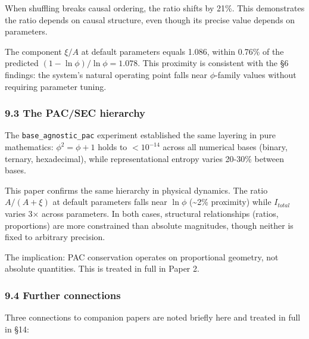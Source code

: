 \documentclass[
  11pt,
  a4paper]{article}
\begin{document}
When shuffling breaks causal ordering, the ratio shifts by 21\%. This
demonstrates the ratio depends on causal structure, even though its
precise value depends on parameters.

The component \(\xi/A\) at default parameters equals 1.086, within
0.76\% of the predicted \((1-\ln\phi)/\ln\phi = 1.078\). This proximity
is consistent with the §6 findings: the system's natural operating point
falls near \(\phi\)-family values without requiring parameter tuning.

\subsubsection{9.3 The PAC/SEC hierarchy}\label{the-pacsec-hierarchy}

The \texttt{base\_agnostic\_pac} experiment established the same
layering in pure mathematics: \(\phi^2 = \phi + 1\) holds to
\(< 10^{-14}\) across all numerical bases (binary, ternary,
hexadecimal), while representational entropy varies 20-30\% between
bases.

This paper confirms the same hierarchy in physical dynamics. The ratio
\(A/(A+\xi)\) at default parameters falls near \(\ln\phi\)
(\textasciitilde2\% proximity) while \(I_{total}\) varies 3× across
parameters. In both cases, structural relationships (ratios,
proportions) are more constrained than absolute magnitudes, though
neither is fixed to arbitrary precision.

The implication: PAC conservation operates on proportional geometry, not
absolute quantities. This is treated in full in Paper 2.

\subsubsection{9.4 Further connections}\label{further-connections}

Three connections to companion papers are noted briefly here and treated
in full in §14:
\end{document}
